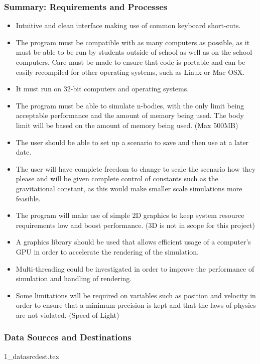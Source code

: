 \subsubsection{Summary: Requirements and Processes}
\begin{itemize}
\item Intuitive and clean interface making use of common keyboard short-cuts.
\item The program must be compatible with as many computers as possible, as it must be able to be run by students outside of school as well as on the school computers. Care must be made to ensure that code is portable and can be easily recompiled for other operating systems, such as Linux or Mac OSX.
\item It must run on 32-bit computers and operating systems.
\item The program must be able to simulate n-bodies, with the only limit being acceptable performance and the amount of memory being used. The body limit will be based on the amount of memory being used. (Max 500MB)
\item The user should be able to set up a scenario to save and then use at a later date.
\item The user will have complete freedom to change to scale the scenario how they please and will be given complete control of constants such as the gravitational constant, as this would make smaller scale simulations more feasible.
\item The program will make use of simple 2D graphics to keep system resource requirements low and boost performance. (3D is not in scope for this project)
\item A graphics library should be used that allows efficient usage of a computer's GPU in order to accelerate the rendering of the simulation.
\item Multi-threading could be investigated in order to improve the performance of simulation and handling of rendering.
\item Some limitations will be required on variables such as position and velocity in order to ensure that a minimum precision is kept and that the laws of physics are not violated. (Speed of Light)
\end{itemize}

\pagebreak

\subsubsection{Data Sources and Destinations}
{1_datasrcdest.tex}

